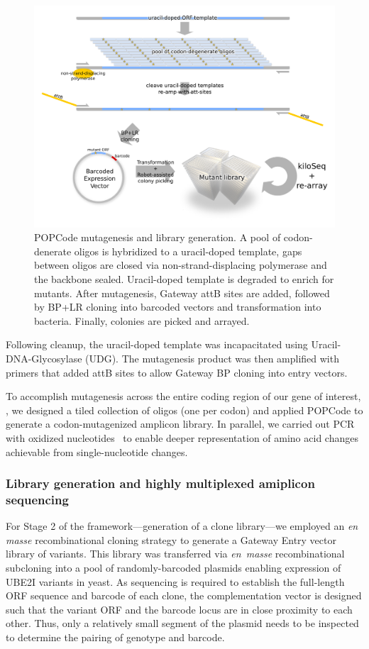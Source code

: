 \begin{figure}[h!]
	\centering
	\includegraphics[width=\textwidth]{img/popcode_schema.pdf}%
	\caption{POPCode mutagenesis and library generation. A pool of codon-denerate oligos is hybridized to a uracil-doped template, gaps between oligos are closed via non-strand-displacing polymerase and the backbone sealed. Uracil-doped template is degraded to enrich for mutants. After mutagenesis, Gateway attB sites are added, followed by BP+LR cloning into barcoded vectors and transformation into bacteria. Finally, colonies are picked and arrayed.}
	\label{fig:popcode_schema}
\end{figure}
Following cleanup, the uracil-doped template was incapacitated using Uracil-DNA-Glycosylase (UDG). The mutagenesis product was then amplified with primers that added attB sites to allow Gateway BP cloning into entry vectors.

To accomplish mutagenesis across the entire coding region of our gene of interest, , we designed a tiled collection of oligos (one per codon) and applied POPCode to generate a codon-mutagenized amplicon library.  In parallel, we carried out PCR with oxidized nucleotides~\cite{oxPCR} to enable deeper representation of amino acid changes achievable from single-nucleotide changes.

\subsubsection{Library generation and highly multiplexed amiplicon sequencing}

For Stage 2 of the framework---generation of a clone library---we employed an \textit{en masse} recombinational cloning strategy to generate a Gateway Entry vector library of  variants. This library was transferred via \textit{en~masse} recombinational subcloning into a pool of randomly-barcoded plasmids enabling expression of UBE2I variants in yeast. As sequencing is required to establish the full-length ORF sequence and barcode of each clone, the complementation vector is designed such that the variant ORF and the barcode locus are in close proximity to each other. Thus, only a relatively small segment of the plasmid needs to be inspected to determine the pairing of genotype and barcode. 

